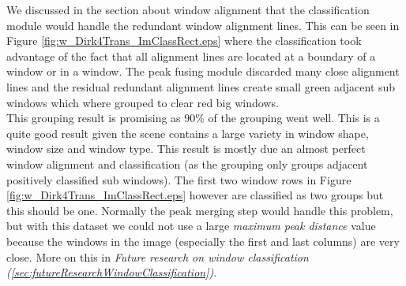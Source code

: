 








We discussed in the section about window alignment that the classification
module would handle the redundant window alignment lines. 
This can be seen in Figure \ref{fig:w_Dirk4Trans_ImClassRect.eps} where the 
classification took advantage of the fact that all alignment lines are located at a boundary of a window or in a window. 
The peak fusing module discarded many close alignment lines and the residual redundant alignment lines create
small green adjacent sub windows which where grouped to clear red big windows.\\

This grouping result is promising as 90\% of the grouping went well.
This is a quite good result given the scene contains a large variety in window
shape, window size and window type.  This result is mostly due an almost perfect window alignment and classification 
(as the grouping only groups adjacent positively classified sub windows).
The first two window rows in Figure \ref{fig:w_Dirk4Trans_ImClassRect.eps}
however are classified as two groups but this should be one.
Normally the peak merging step would handle this problem, but with this dataset
we could not use a large \emph{maximum peak distance} value because the windows
in the image (especially the first and last columns) are very close.  More on
this in \emph{Future research on window classification
(\ref{sec:futureResearchWindowClassification})}.



